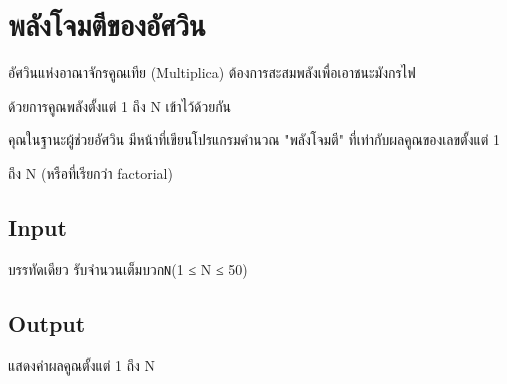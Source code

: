 \documentclass{article}
\begin{document}
\section*{พลังโจมตีของอัศวิน}

อัศวินแห่งอาณาจักรคูณเทีย (Multiplica) ต้องการสะสมพลังเพื่อเอาชนะมังกรไฟ

ด้วยการคูณพลังตั้งแต่ 1 ถึง N เข้าไว้ด้วยกัน



คุณในฐานะผู้ช่วยอัศวิน มีหน้าที่เขียนโปรแกรมคำนวณ "พลังโจมตี" ที่เท่ากับผลคูณของเลขตั้งแต่ 1

ถึง N (หรือที่เรียกว่า factorial)



\subsection*{Input}
บรรทัดเดียว รับจำนวนเต็มบวก\texttt{N}(1 ≤ N ≤ 50)\\



\subsection*{Output}
แสดงค่าผลคูณตั้งแต่ 1 ถึง N\\
\end{document}
